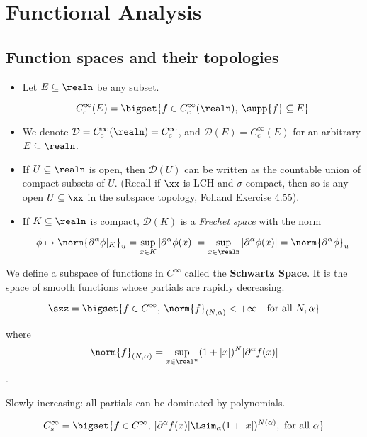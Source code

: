 \hypertarget{functional-analysis}{%
\section{Functional Analysis}\label{functional-analysis}}

\hypertarget{function-spaces-and-their-topologies}{%
\subsection{Function spaces and their
topologies}\label{function-spaces-and-their-topologies}}

\begin{itemize}
\item
  Let \(E\subseteq \realn\) be any subset.

  \[
    C_c^\infty(E) = \bigset{f\in C_c^\infty(\realn),\: \supp{f}\subseteq E}
    \]
\item
  We denote \(\mathcal{D} = C_c^\infty(\realn) = C_c^\infty\), and
  \(\mathcal{D}(E) = C_c^\infty(E)\) for an arbitrary
  \(E\subseteq\realn\).
\item
  If \(U\subseteq\realn\) is open, then \(\mathcal{D}(U)\) can be
  written as the countable union of compact subsets of \(U\). (Recall if
  \(\xx\) is LCH and \(\sigma\)-compact, then so is any open
  \(U\subseteq \xx\) in the subspace topology, Folland Exercise 4.55).
\item
  If \(K\subseteq\realn\) is compact, \(\mathcal{D}(K)\) is a
  \emph{Frechet space} with the norm

  \[
    \phi\mapsto \norm{\partial^\alpha \phi\vert_{K}}_u = \sup_{x\in K}\vert \partial^\alpha \phi(x)\vert  = \sup_{x\in \realn}\vert\partial^\alpha \phi(x)\vert = \norm{\partial^\alpha\phi}_u
    \]
\end{itemize}

We define a subspace of functions in \(C^\infty\) called the
\textbf{Schwartz Space}. It is the space of smooth functions whose
partials are rapidly decreasing.

\[
\szz = \bigset{f\in C^\infty,\: \norm{f}_{(N,\alpha)}<+\infty \quad \text{for all }N,\alpha}
\]

where
\[\norm{f}_{(N,\alpha)} = \sup_{x\in\real^{n}}(1 + \vert x\vert)^N\vert\partial^\alpha f(x)\vert\].

Slowly-increasing: all partials can be dominated by polynomials.

\[
C_{s}^\infty = \bigset{f\in C^\infty,\: \vert \partial^\alpha f(x)\vert \Lsim_{\alpha} (1+\vert x\vert)^{N(\alpha)},\text{ for all }\alpha}
\]

